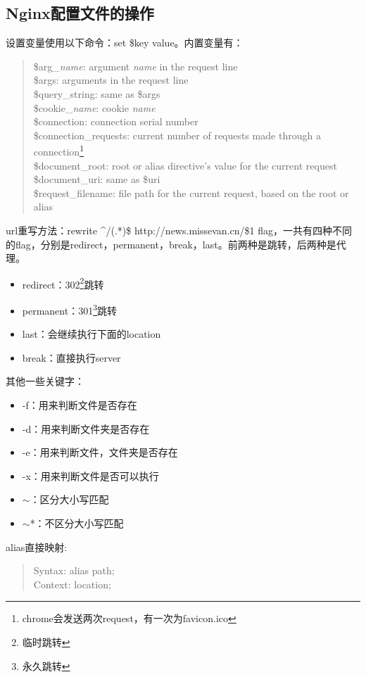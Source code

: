\documentclass[UTF8]{ctexart}
\newenvironment{myquote}
  {\begin{quote} \kaishu \zihao{-5}}
  {\end{quote}}
\begin{document}
\subsection{Nginx配置文件的操作}
设置变量使用以下命令：set \$key value。内置变量有：
\begin{myquote}
\$arg\_\emph{name}: argument \emph{name} in the request line \\
\$args: arguments in the request line \\
\$query\_string: same as \$args \\
\$cookie\_\emph{name}: cookie \emph{name} \\
\$connection: connection serial number \\
\$connection\_requests: current number of requests made through a connection\footnote{chrome会发送两次request，有一次为favicon.ico} \\
\$document\_root: root or alias directive's value for the current request \\
\$document\_uri: same as \$uri \\
\$request\_filename: file path for the current request, based on the root or alias

\end{myquote}

url重写方法：rewrite \^{}/(.*)\$ http://news.missevan.cn/\$1 flag，一共有四种不同的flag，分别是redirect，permanent，break，last。前两种是跳转，后两种是代理。
\begin{itemize}
  \item redirect：302\footnote{临时跳转}跳转
  \item permanent：301\footnote{永久跳转}跳转
  \item last：会继续执行下面的location
  \item break：直接执行server
\end{itemize}

其他一些关键字：
\begin{itemize}
  \item -f：用来判断文件是否存在
  \item -d：用来判断文件夹是否存在
  \item -e：用来判断文件，文件夹是否存在
  \item -x：用来判断文件是否可以执行
  \item $\sim$：区分大小写匹配
  \item $\sim$*：不区分大小写匹配
\end{itemize}

alias直接映射:
\begin{myquote}
  Syntax: alias path; \\
  Context: location;
\end{myquote}
\end{document}
